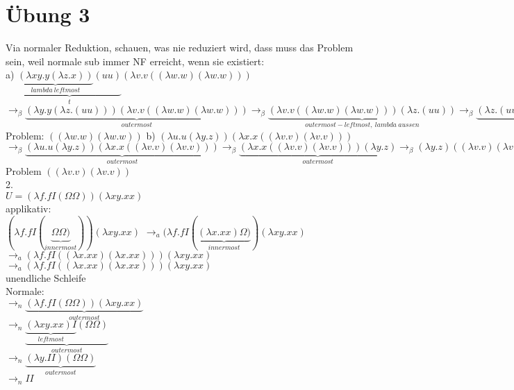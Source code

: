 \documentclass{article}
\begin{document}
	\section{Übung 3}
	Via normaler Reduktion, schauen, was nie reduziert wird, dass muss das Problem sein, weil normale sub immer NF erreicht, wenn sie existiert:\\
	a) $\underbrace{\underbrace{(\lambda xy.y(\lambda z.x))}_{lambda\ leftmost} (uu)}_t (\lambda v.v((\lambda w.w)(\lambda w.w)))$\\
	$\to_\beta \underbrace{(\lambda y.y(\lambda z.(uu)))  (\lambda v.v((\lambda w.w)(\lambda w.w)))}_{outermost} \to_\beta \underbrace{(\lambda v.v((\lambda w.w)(\lambda w.w)))(\lambda z.(uu))}_{outermost-leftmost,\ lambda\ aussen}\to_\beta \underbrace{(\lambda z.(uu))((\lambda w.w)(\lambda w.w))}_{outermost-leftmost}\to_\beta^* uu $\\
	Problem: $((\lambda w.w)(\lambda w.w))$
	b) $(\lambda u.u (\lambda y.z))(\lambda x.x((\lambda v.v)(\lambda v.v)))$\\
	$\to_\beta \underbrace{(\lambda u.u (\lambda y.z))(\lambda x.x((\lambda v.v)(\lambda v.v)))}_{outermost}\to_\beta \underbrace{(\lambda x.x((\lambda v.v)(\lambda v.v)))(\lambda y.z)}_{outermost} \to_\beta (\lambda y.z)((\lambda v.v)(\lambda v.v))\to_\beta z$\\
	Problem $((\lambda v.v)(\lambda v.v))$\\
	2.\\
	$U = (\lambda f.f I (\Omega\Omega))(\lambda xy.xx)$\\
	applikativ:\\
	$(\lambda f.f I (\underbrace{\Omega\Omega)}_{innermost}))(\lambda xy.xx)$
	$\to_a (\lambda f.f I (\underbrace{(\lambda x.xx)\Omega)}_{innermost})(\lambda xy.xx)$\\
	$\to_a (\lambda f.f I ((\lambda x.xx)(\lambda x.xx)))(\lambda xy.xx)$\\
	$\to_a (\lambda f.f I ((\lambda x.xx)(\lambda x.xx)))(\lambda xy.xx)$\\
	unendliche Schleife\\
	Normale:\\
	$\to_n\underbrace{(\lambda f.f I (\Omega\Omega))(\lambda xy.xx)}_{outermost}$\\
	$\to_n\underbrace{\underbrace{(\lambda xy.xx)I}_{leftmost} (\Omega\Omega)}_{outermost}$\\
	$\to_n\underbrace{(\lambda y.II) (\Omega\Omega)}_{outermost}$\\
	$\to_n II$\\
\end{document}
